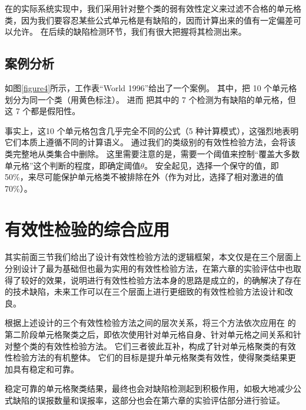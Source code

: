 在\wa 的实际系统实现中，我们采用针对整个类的弱有效性定义来过滤不合格的单元格类，因为我们要容忍某些公式单元格是有缺陷的，因而计算出来的值有一定偏差可以允许。
在后续的缺陷检测环节，我们有很大把握将其检测出来。

\subsection*{案例分析}

如图\ref{figure4}所示，工作表“World 1996”给出了一个案例。
其中，\cu 把 10 个单元格划分为同一个类（用黄色标注）。
进而 \cu 把其中的 7 个检测为有缺陷的单元格，但这 7 个都是假阳性。

事实上，这10 个单元格包含几乎完全不同的公式（5 种计算模式），这强烈地表明它们本质上遵循不同的计算语义。
通过我们的类级别的有效性检验方法，\wa 会将该类完整地从类集合中删除。
这里需要注意的是，\wa 需要一个阈值来控制“覆盖大多数单元格”这个判断的程度，即确定阈值$\theta$。
安全起见，\wa 选择一个保守的值，即 50\%，来尽可能保护单元格类不被排除在外（作为对比，\ca 选择了相对激进的值70\%）。


\section{有效性检验的综合应用}
其实前面三节我们给出了设计有效性检验方法的逻辑框架，本文仅是在三个层面上分别设计了最为基础但也最为实用的有效性检验方法，在第六章的实验评估中也取得了较好的效果，说明进行有效性检验方法本身的思路是成立的，的确解决了\cu 存在的技术缺陷，未来工作可以在三个层面上进行更细致的有效性检验方法设计和改良。

根据上述设计的三个有效性检验方法之间的层次关系，\wa 将三个方法依次应用在 \cu 的第二阶段单元格聚类之后，即依次使用针对单元格自身、针对单元格之间关系和针对整个类的有效性检验方法。
它们三者彼此互补，构成了针对单元格聚类的有效性检验方法的有机整体。
它们的目标是提升单元格聚类有效性，使得聚类结果更加具有稳定和可靠。

稳定可靠的单元格聚类结果，最终也会对缺陷检测起到积极作用，如极大地减少公式缺陷的误报数量和误报率，这部分也会在第六章的实验评估部分进行验证。